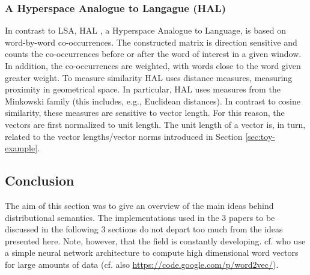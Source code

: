 \subsubsection{A Hyperspace Analogue to Langague (HAL)}
\label{sec:hal}
In contrast to LSA, HAL \citep{LundandBurgess:1996}, a Hyperspace Analogue to Language, is based
on word-by-word co-occurrences. The constructed matrix is direction
sensitive and counts the co-occurrences before or after the word of
interest in a given window. In addition, the co-occurrences are
weighted, with words close to the word given greater weight. To
measure similarity HAL
uses distance measures, measuring proximity in geometrical space. In
particular, HAL uses measures from the Minkowski family (this includes, e.g.,
Euclidean distances). 
In contrast to cosine
similarity, these measures are sensitive to vector length. For this reason, the vectors are first
normalized to unit length. The unit length of a vector is, in turn,
related to the vector lengths/vector norms introduced in Section \ref{sec:toy-example}.


\subsection{Conclusion}
\label{sec:ds-conclusion}

The aim of this section was to give an overview of
the main ideas behind distributional semantics. The
implementations used in the 3 papers to be discussed in the following 3 sections do not depart too much from
the ideas presented here. Note, however, that the field is constantly
developing. cf. \citet{Mikolovetal:2013} who use a simple neural
network architecture to compute high dimensional word vectors for
large amounts of data (cf. also \url{https://code.google.com/p/word2vec/}).
\section{\citet{Reddyetal:2011}}
\label{sec:Reddyetal2011sum}

